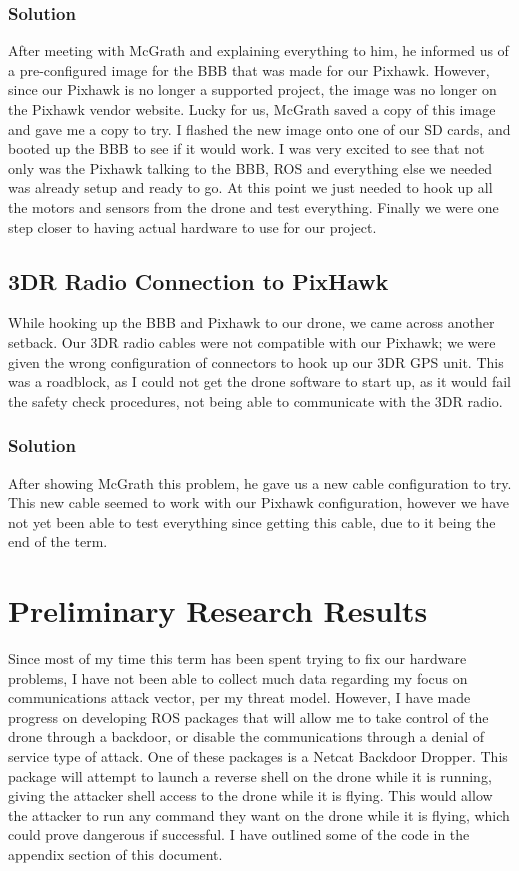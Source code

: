 \documentclass[IEEEtran,letterpaper,10pt,notitlepage,draftclsnofoot,onecolumn]{article}
\begin{document}
    \subsubsection{Solution}
    After meeting with McGrath and explaining everything to him, he informed us of a pre-configured image for the BBB that was made for our Pixhawk. However, since our Pixhawk is no longer a supported project, the image was no longer on the Pixhawk vendor website. Lucky for us, McGrath saved a copy of this image and gave me a copy to try. I flashed the new image onto one of our SD cards, and booted up the BBB to see if it would work. I was very excited to see that not only was the Pixhawk talking to the BBB, ROS and everything else we needed was already setup and ready to go. At this point we just needed to hook up all the motors and sensors from the drone and test everything. Finally we were one step closer to having actual hardware to use for our project.

  \subsection{3DR Radio Connection to PixHawk}
  While hooking up the BBB and Pixhawk to our drone, we came across another setback. Our 3DR radio cables were not compatible with our Pixhawk; we were given the wrong configuration of connectors to hook up our 3DR GPS unit. This was a roadblock, as I could not get the drone software to start up, as it would fail the safety check procedures, not being able to communicate with the 3DR radio.

    \subsubsection{Solution}
    After showing McGrath this problem, he gave us a new cable configuration to try. This new cable seemed to work with our Pixhawk configuration, however we have not yet been able to test everything since getting this cable, due to it being the end of the term.

\section{Preliminary Research Results}
Since most of my time this term has been spent trying to fix our hardware problems, I have not been able to collect much data regarding my focus on communications attack vector, per my threat model. However, I have made progress on developing ROS packages that will allow me to take control of the drone through a backdoor, or disable the communications through a denial of service type of attack. One of these packages is a Netcat Backdoor Dropper. This package will attempt to launch a reverse shell on the drone while it is running, giving the attacker shell access to the drone while it is flying. This would allow the attacker to run any command they want on the drone while it is flying, which could prove dangerous if successful. I have outlined some of the code in the appendix section of this document.
\end{document}
